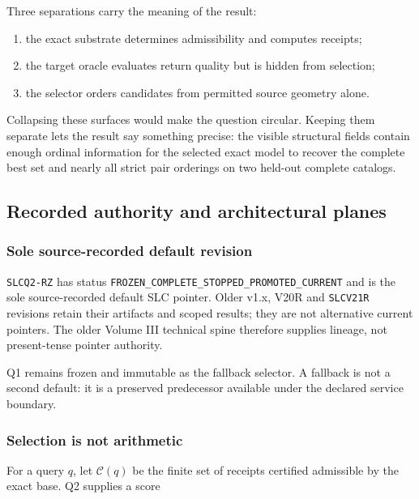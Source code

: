 Three separations carry the meaning of the result:

\begin{enumerate}
\def\labelenumi{\arabic{enumi}.}
\tightlist
\item
  the exact substrate determines admissibility and computes receipts;
\item
  the target oracle evaluates return quality but is hidden from
  selection;
\item
  the selector orders candidates from permitted source geometry alone.
\end{enumerate}

Collapsing these surfaces would make the question circular. Keeping them
separate lets the result say something precise: the visible structural
fields contain enough ordinal information for the selected exact model
to recover the complete best set and nearly all strict pair orderings on
two held-out complete catalogs.

\subsection{Recorded authority and architectural
planes}\label{viii-ch07-recorded-authority-and-architectural-planes}

\subsubsection{Sole source-recorded default
revision}\label{viii-ch07-sole-source-recorded-default-revision}

\texttt{SLCQ2-RZ} has status
\nolinkurl{FROZEN_COMPLETE_STOPPED_PROMOTED_CURRENT} and is the sole
source-recorded default SLC pointer. Older v1.x, V20R and
\texttt{SLCV21R} revisions retain their artifacts and scoped results;
they are not alternative current pointers. The older Volume III
technical spine therefore supplies lineage, not present-tense pointer
authority.

Q1 remains frozen and immutable as the fallback selector. A fallback is
not a second default: it is a preserved predecessor available under the
declared service boundary.

\subsubsection{Selection is not
arithmetic}\label{viii-ch07-selection-is-not-arithmetic}

For a query \(q\), let \(\mathcal C(q)\) be the finite set of receipts
certified admissible by the exact base. Q2 supplies a score


